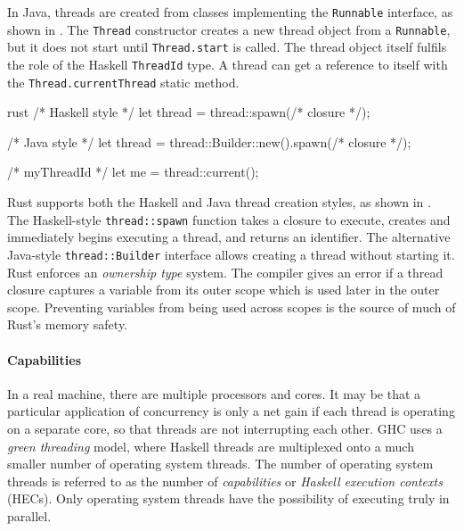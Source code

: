 In Java\cite{lea1996}, threads are created from classes implementing
the \verb|Runnable| interface, as shown in .  The
\verb|Thread| constructor creates a new thread object from a
\verb|Runnable|, but it does not start until \verb|Thread.start| is
called.  The thread object itself fulfils the role of the Haskell
\verb|ThreadId| type.  A thread can get a reference to itself with the
\verb|Thread.currentThread| static method.

\begin{listing}
\centering
\begin{cminted}{rust}
/* Haskell style */
let thread = thread::spawn(/* closure */);

/* Java style */
let thread = thread::Builder::new().spawn(/* closure */);

/* myThreadId */
let me = thread::current();
\end{cminted}
\caption{Basic threading operations in Rust.}\label{lst:basic_rust}
\end{listing}

Rust\cite{rust2011} supports both the Haskell and Java thread creation
styles, as shown in .  The Haskell-style
\verb|thread::spawn| function takes a closure to execute, creates and
immediately begins executing a thread, and returns an identifier.  The
alternative Java-style \verb|thread::Builder| interface allows
creating a thread without starting it.  Rust enforces an
\emph{ownership type} system.  The compiler gives an error if a thread
closure captures a variable from its outer scope which is used later
in the outer scope.  Preventing variables from being used across
scopes is the source of much of Rust's memory safety.

\paragraph{Capabilities}
In a real machine, there are multiple processors and cores.  It may be
that a particular application of concurrency is only a net gain if
each thread is operating on a separate core, so that threads are not
interrupting each other.  GHC uses a \emph{green threading} model,
where Haskell threads are multiplexed onto a much smaller number of
operating system threads\cite{marlow2009}.  The number of operating
system threads is referred to as the number of \emph{capabilities} or
\emph{Haskell execution contexts} (HECs)\cite{marlow2009}.  Only
operating system threads have the possibility of executing truly in
parallel.


